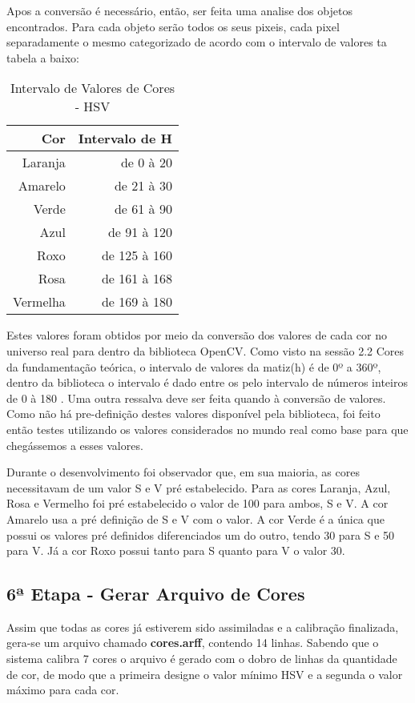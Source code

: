 Apos a conversão é necessário, então, ser feita uma analise dos objetos encontrados. Para cada objeto serão todos os seus pixeis, cada pixel separadamente o mesmo categorizado de acordo com o intervalo de valores ta tabela a baixo:

\begin{table}[H]
\centering
\begin{tabular}{r|r}
Cor & Intervalo de H \\ %
\hline                               %
Laranja & de 0 à 20 \\
\hline 
Amarelo & de 21 à 30\\
\hline 
Verde & de 61 à 90 \\
\hline 
Azul& de 91 à 120 \\
\hline 
Roxo & de 125 à 160 \\
\hline 
Rosa & de 161 à 168 \\
\hline 
Vermelha & de 169 à 180 \\
\hline 
\end{tabular}
\caption{Intervalo de Valores de Cores - HSV}
\end{table}

Estes valores foram obtidos por meio da conversão dos valores de cada cor no universo real para dentro da biblioteca OpenCV. Como visto na sessão 2.2 Cores da fundamentação teórica, o intervalo de valores da matiz(h) é de 0º a 360º, dentro da biblioteca o intervalo é dado entre os pelo intervalo de números inteiros de 0 à 180 . Uma outra ressalva deve ser feita quando à conversão de valores. Como não há pre-definição destes valores disponível pela biblioteca, foi feito então testes utilizando os valores considerados no mundo real como base para que chegássemos a esses valores.

Durante o desenvolvimento foi observador que, em sua maioria, as cores necessitavam de um valor S e V pré estabelecido. Para as cores Laranja, Azul, Rosa e Vermelho foi pré estabelecido o valor de 100 para ambos, S e V. A cor Amarelo usa a pré definição de S e V com o valor. A cor Verde é a única que possui os valores pré definidos diferenciados um do outro, tendo 30 para S e 50 para V. Já a cor Roxo possui tanto para S quanto para V o valor 30.

  \subsection{6ª Etapa - Gerar Arquivo de Cores}
  Assim que todas as cores já estiverem sido assimiladas e a calibração finalizada, gera-se um arquivo chamado \textbf{cores.arff}, contendo 14 linhas. Sabendo que o sistema calibra 7 cores o arquivo é gerado com o dobro de linhas da quantidade de cor, de modo que a primeira designe o valor mínimo HSV e a segunda o valor máximo para cada cor.